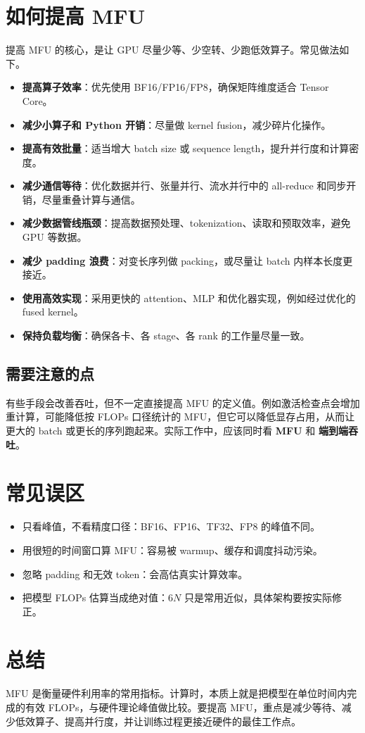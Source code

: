 \documentclass[UTF8,a4paper,11pt]{ctexart}
\begin{document}
\section{如何提高 MFU}
提高 MFU 的核心，是让 GPU 尽量少等、少空转、少跑低效算子。常见做法如下。

\begin{itemize}
  \item \textbf{提高算子效率}：优先使用 BF16/FP16/FP8，确保矩阵维度适合 Tensor Core。
  \item \textbf{减少小算子和 Python 开销}：尽量做 kernel fusion，减少碎片化操作。
  \item \textbf{提高有效批量}：适当增大 batch size 或 sequence length，提升并行度和计算密度。
  \item \textbf{减少通信等待}：优化数据并行、张量并行、流水并行中的 all-reduce 和同步开销，尽量重叠计算与通信。
  \item \textbf{减少数据管线瓶颈}：提高数据预处理、tokenization、读取和预取效率，避免 GPU 等数据。
  \item \textbf{减少 padding 浪费}：对变长序列做 packing，或尽量让 batch 内样本长度更接近。
  \item \textbf{使用高效实现}：采用更快的 attention、MLP 和优化器实现，例如经过优化的 fused kernel。
  \item \textbf{保持负载均衡}：确保各卡、各 stage、各 rank 的工作量尽量一致。
\end{itemize}

\subsection*{需要注意的点}
有些手段会改善吞吐，但不一定直接提高 MFU 的定义值。例如激活检查点会增加重计算，可能降低按 FLOPs 口径统计的 MFU，但它可以降低显存占用，从而让更大的 batch 或更长的序列跑起来。实际工作中，应该同时看 \textbf{MFU} 和 \textbf{端到端吞吐}。

\section{常见误区}
\begin{itemize}
  \item 只看峰值，不看精度口径：BF16、FP16、TF32、FP8 的峰值不同。
  \item 用很短的时间窗口算 MFU：容易被 warmup、缓存和调度抖动污染。
  \item 忽略 padding 和无效 token：会高估真实计算效率。
  \item 把模型 FLOPs 估算当成绝对值：$6N$ 只是常用近似，具体架构要按实际修正。
\end{itemize}

\section{总结}
MFU 是衡量硬件利用率的常用指标。计算时，本质上就是把模型在单位时间内完成的有效 FLOPs，与硬件理论峰值做比较。要提高 MFU，重点是减少等待、减少低效算子、提高并行度，并让训练过程更接近硬件的最佳工作点。
\end{document}
